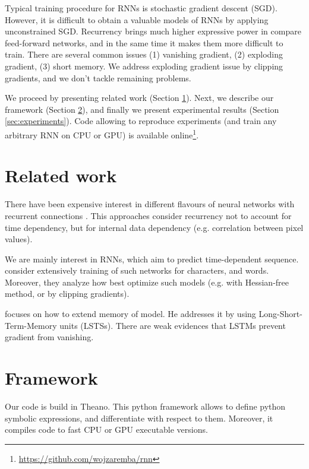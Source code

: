 \documentclass{article}
\begin{document}
Typical training procedure for RNNs is stochastic gradient descent (SGD). However, it is difficult to obtain
a valuable models of RNNs by applying unconstrained SGD.
Recurrency brings much higher expressive power in compare feed-forward networks, and in the same time it makes them more difficult to train. There
are several common issues (1) vanishing gradient, (2) exploding gradient, (3) short memory. We address
exploding gradient issue by clipping gradients, and we don't tackle remaining problems.


We proceed by presenting related work (Section \ref{sec:related work}). Next, we describe our framework (Section
\ref{sec:framework}), and finally we present experimental results (Section \ref{sec:experiments}). 
Code allowing to reproduce experiments (and train any arbitrary RNN on CPU or GPU) is available online\footnote{\url{https://github.com/wojzaremba/rnn}}.

\section{Related work}\label{sec:related work}
There have been expensive interest in different flavours of neural networks 
with recurrent connections \cite{hopfield1982neural, hinton2006fast}. This
approaches consider recurrency not to account for time dependency, but
for internal data dependency (e.g. correlation between pixel values). 


We are mainly interest in RNNs, which aim to predict 
time-dependent sequence. \cite{mikolov2012statistical} 
\cite{sutskever2013training} consider extensively 
training of such networks for characters, and words. Moreover,
they analyze how best optimize such models (e.g. with Hessian-free method, or 
by clipping gradients).


\cite{graves2013generating} focuses on how to extend memory of model. 
He addresses it by using Long-Short-Term-Memory units (LSTSs).
There are weak evidences that LSTMs prevent gradient from vanishing.

\section{Framework}\label{sec:framework}
Our code is build in Theano. This python framework allows to define python symbolic expressions, and 
differentiate with respect to them. Moreover, it compiles code to fast CPU or GPU executable versions.
\end{document}
